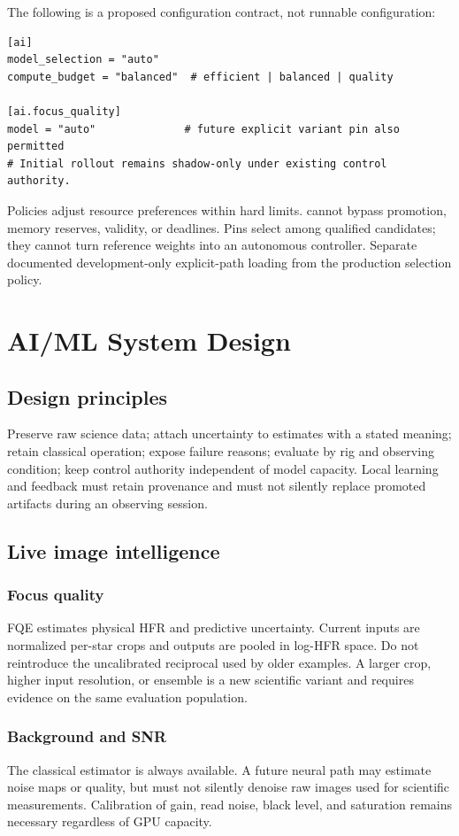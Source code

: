 \documentclass[11pt,a4paper]{article}
\newcommand{\code}[1]{\texttt{\detokenize{#1}}}
\begin{document}
The following is a proposed configuration contract, not runnable configuration:
\begin{lstlisting}
[ai]
model_selection = "auto"
compute_budget = "balanced"  # efficient | balanced | quality

[ai.focus_quality]
model = "auto"              # future explicit variant pin also permitted
# Initial rollout remains shadow-only under existing control authority.
\end{lstlisting}
Policies adjust resource preferences within hard limits. \code{quality} cannot
bypass promotion, memory reserves, validity, or deadlines. Pins select among
qualified candidates; they cannot turn reference weights into an autonomous
controller. Separate documented development-only explicit-path loading from
the production selection policy.

\section{AI/ML System Design}
\subsection{Design principles}
Preserve raw science data; attach uncertainty to estimates with a stated
meaning; retain classical operation; expose failure reasons; evaluate by rig
and observing condition; keep control authority independent of model capacity.
Local learning and feedback must retain provenance and must not silently
replace promoted artifacts during an observing session.

\subsection{Live image intelligence}
\subsubsection{Focus quality}
FQE estimates physical HFR and predictive uncertainty. Current inputs are
normalized per-star crops and outputs are pooled in log-HFR space. Do not
reintroduce the uncalibrated reciprocal \code{sharpness_score} used by older
examples. A larger crop, higher input resolution, or ensemble is a new
scientific variant and requires evidence on the same evaluation population.

\subsubsection{Background and SNR}
The classical estimator is always available. A future neural path may estimate
noise maps or quality, but must not silently denoise raw images used for
scientific measurements. Calibration of gain, read noise, black level, and
saturation remains necessary regardless of GPU capacity.
\end{document}
